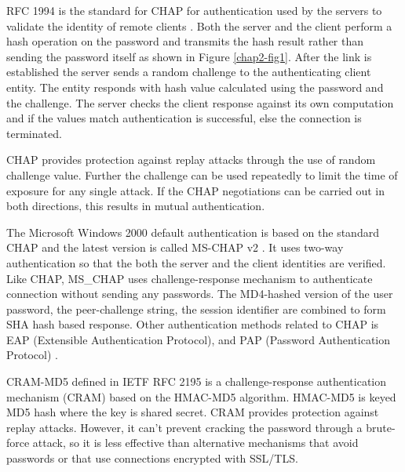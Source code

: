 \begin{multicols}{2}
RFC 1994 is the standard for CHAP for authentication used by the servers to validate the identity of remote clients \cite{chap2-key5}. Both the server and the client perform a hash operation on the password and transmits the hash result rather than sending the password itself as shown in Figure \ref{chap2-fig1}. After the link is established the server sends a random challenge to the authenticating client entity. The entity responds with hash value calculated using the password and the challenge. The server checks the client response against its own computation and if the values match authentication is successful, else the connection is terminated.

CHAP provides protection against replay attacks through the use of random challenge value. Further the challenge can be used repeatedly to limit the time of exposure for any single attack. If the CHAP negotiations can be carried out in both directions, this results in mutual authentication.

The Microsoft Windows 2000 default authentication is based on the standard CHAP and the latest version is called MS-CHAP v2 \cite{chap2-key4}. It uses two-way authentication so that the both the server and the client identities are verified. Like CHAP, MS\_CHAP uses challenge-response mechanism to authenticate connection without sending any passwords. The MD4-hashed version of the user password, the peer-challenge string, the session identifier are combined to form SHA hash based response. Other authentication methods related to CHAP is EAP (Extensible Authentication Protocol), and PAP (Password Authentication Protocol) \cite{chap2-key4}.

CRAM-MD5 defined in IETF RFC 2195 \cite{chap2-key6} is a challenge-response authentication mechanism (CRAM) based on the HMAC-MD5 algorithm. HMAC-MD5 is keyed MD5 hash where the key is shared secret. CRAM provides protection against replay attacks. However, it can't prevent cracking the password through a brute-force attack, so it is less effective than alternative mechanisms that avoid passwords or that use connections encrypted with SSL/TLS. 


\end{multicols}
